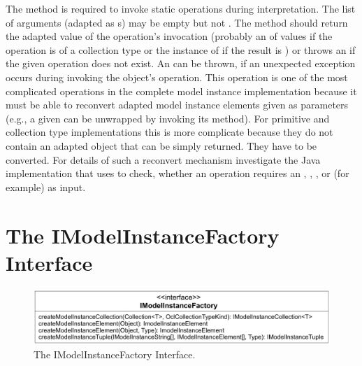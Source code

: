 The method 
is required to invoke static operations during interpretation. The list of 
arguments (adapted as s) may be empty but
not . The method should return the adapted value of the operation's 
invocation (probably an  of values if the 
operation is of a collection type or the instance of 
if the result is ) or throws an 
 if the given operation does not 
exist. An  can be thrown, if an
unexpected exception occurs during invoking the object's operation. This
operation is one of the most complicated operations in the complete model
instance implementation because it must be able to reconvert adapted model
instance elements given as parameters (e.g., a given
 can be unwrapped by invoking its 
method). For primitive and collection type implementations this is more
complicate because they do not contain an adapted object that can be simply
returned. They have to be converted. For details of such a reconvert mechanism
investigate the Java implementation that uses  to
check, whether an operation requires an , ,
, or  (for example) as input.



\section{The IModelInstanceFactory Interface}

\begin{figure}
	\centering
	\includegraphics[width=1.0\linewidth]{figures/modelInstanceTypeAdaptation/modelInstanceFactoryInterface}
	\caption{The IModelInstanceFactory Interface.}
	\label{pic:modelInstanceTypeAdaptation:modelInstanceFactoryInterface}
\end{figure}

